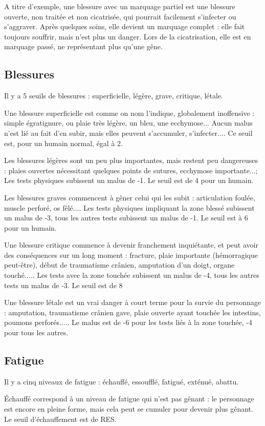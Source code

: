 \documentclass[10pt,a4paper,twocolumn]{book}
\begin{document}
A titre d'exemple, une blessure avec un marquage partiel est une blessure ouverte, non traitée et non cicatrisée, qui pourrait facilement s'infecter ou s'aggraver. Après quelques soins, elle devient un marquage complet : elle fait toujours souffrir, mais n'est plus un danger. Lors de la cicatrisation, elle est en marquage passé, ne représentant plus qu'une gêne.
\subsection{Blessures}
Il y a 5 seuils de blessures : superficielle, légère, grave, critique, létale.

Une blessure superficielle est comme on nom l'indique, globalement inoffensive : simple égratignure, ou plaie très légère, un bleu, une ecchymose... Aucun malus n'est lié au fait d'en subir, mais elles peuvent s'accumuler, s'infecter....  Ce seuil est, pour un humain normal, égal à 2.

Les blessures légères sont un peu plus importantes, mais restent peu dangereuses : plaies ouvertes nécessitant quelques points de sutures, ecchymose importante...; Les tests physiques subissent un malus de -1. Le seuil est de 4 pour un humain.

Les blessures graves commencent à gêner celui qui les subit : articulation foulée, muscle perforé, os fêlé.... Les tests physiques impliquant la zone blessé subissent un malus de -3, tous les autres tests subissent un malus de -1. Le seuil est à 6 pour un humain.

Une blessure critique commence à devenir franchement inquiétante, et peut avoir des conséquences sur un long moment : fracture, plaie importante (hémorragique peut-être), début de traumatisme crânien, amputation d'un doigt, organe touché..... Les tests avec la zone touchée subissent un malus de -4, tous les autres tests un malus de -3. Le seuil est de 8

Une blessure létale est un vrai danger à court terme pour la survie du personnage : amputation, traumatisme crânien gave, plaie ouverte ayant touchée les intestins, poumons perforés..... Le malus est de -6 pour les tests liés à la zone touchée, -4 pour tous les autres.

\subsection{Fatigue}
Il y a cinq niveaux de fatigue : échauffé, essoufflé, fatigué, exténué, abattu.

Échauffé correspond à un niveau de fatigue qui n'est pas gênant : le personnage est encore en pleine forme, mais cela peut se cumuler pour devenir plus gênant. Le seuil d'échauffement est de RES.
\end{document}
